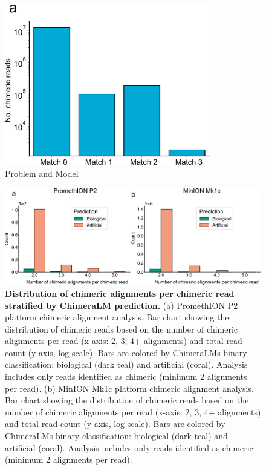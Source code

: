 \documentclass[pdflatex,sn-nature]{sn-jnl}%
\theoremstyle{thmstyleone}%
\theoremstyle{thmstyletwo}%
\theoremstyle{thmstylethree}%
\begin{document}
\begin{figure}[!ht]
	\begin{center}
		\includegraphics[width=0.8\textwidth]{final_figures/sf1}
	\end{center}
	\caption{Problem and Model}\label{fig:sf1}
\end{figure}

\begin{figure}[!ht]
	\begin{center}
		\includegraphics[width=\textwidth]{final_figures/sf2}
	\end{center}
	\caption{{\bf Distribution of chimeric alignments per chimeric read stratified by ChimeraLM prediction.}
		(a) PromethION P2 platform chimeric alignment analysis. Bar chart showing the distribution of chimeric reads based on the number of chimeric alignments per read (x-axis: 2, 3, 4+ alignments) and total read count (y-axis, log scale). Bars are colored by ChimeraLM\textquotesingle s binary classification: biological (dark teal) and artificial (coral). Analysis includes only reads identified as chimeric (minimum 2 alignments per read).
		(b) MinION Mk1c platform chimeric alignment analysis. Bar chart showing the distribution of chimeric reads based on the number of chimeric alignments per read (x-axis: 2, 3, 4+ alignments) and total read count (y-axis, log scale). Bars are colored by ChimeraLM\textquotesingle s binary classification: biological (dark teal) and artificial (coral). Analysis includes only reads identified as chimeric (minimum 2 alignments per read). }\label{fig:sf2}
\end{figure}
\end{document}
